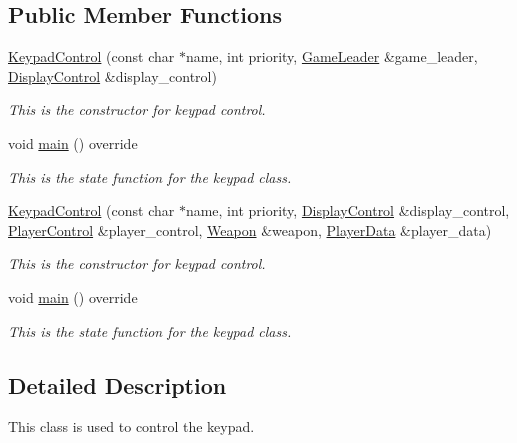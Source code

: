 \subsection*{Public Member Functions}
\begin{DoxyCompactItemize}
\item 
\mbox{\hyperlink{class_keypad_control_ade69a59ba2a34bde40809433952cb153}{Keypad\+Control}} (const char $\ast$name, int priority, \mbox{\hyperlink{class_game_leader}{Game\+Leader}} \&game\+\_\+leader, \mbox{\hyperlink{class_display_control}{Display\+Control}} \&display\+\_\+control)
\begin{DoxyCompactList}\small\item\em This is the constructor for keypad control. \end{DoxyCompactList}\item 
void \mbox{\hyperlink{class_keypad_control_a66ec8a33eceb20d5d1d243c270c3718b}{main}} () override
\begin{DoxyCompactList}\small\item\em This is the state function for the keypad class. \end{DoxyCompactList}\item 
\mbox{\hyperlink{class_keypad_control_a4de1bb3018f819011222461d64aa2d67}{Keypad\+Control}} (const char $\ast$name, int priority, \mbox{\hyperlink{class_display_control}{Display\+Control}} \&display\+\_\+control, \mbox{\hyperlink{class_player_control}{Player\+Control}} \&player\+\_\+control, \mbox{\hyperlink{class_weapon}{Weapon}} \&weapon, \mbox{\hyperlink{class_player_data}{Player\+Data}} \&player\+\_\+data)
\begin{DoxyCompactList}\small\item\em This is the constructor for keypad control. \end{DoxyCompactList}\item 
void \mbox{\hyperlink{class_keypad_control_a66ec8a33eceb20d5d1d243c270c3718b}{main}} () override
\begin{DoxyCompactList}\small\item\em This is the state function for the keypad class. \end{DoxyCompactList}\end{DoxyCompactItemize}


\subsection{Detailed Description}
This class is used to control the keypad. 

